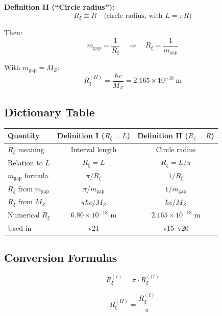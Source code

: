 \documentclass[11pt,a4paper]{article}
\newcommand{\Rxi}{R_\xi}
\newcommand{\MZ}{M_Z}
\newcommand{\mgap}{m_{\mathrm{gap}}}
\begin{document}
\textbf{Definition II (``Circle radius''):}
\begin{equation}
\Rxi \equiv R \quad \text{(circle radius, with } L = \pi R\text{)}
\label{eq:Rxi-def-II}
\end{equation}

Then:
\begin{equation}
\mgap = \frac{1}{\Rxi} \quad \Rightarrow \quad \Rxi = \frac{1}{\mgap}
\label{eq:def-II-relations}
\end{equation}

With $\mgap = \MZ$:
\begin{equation}
\Rxi^{(II)} = \frac{\hbar c}{\MZ} = 2.165 \times 10^{-18}~\mathrm{m}
\label{eq:Rxi-II-numerical}
\end{equation}

\subsection{Dictionary Table}

\begin{center}
\begin{tabular}{lcc}
\toprule
\textbf{Quantity} & \textbf{Definition I} ($\Rxi = L$) & \textbf{Definition II} ($\Rxi = R$) \\
\midrule
$\Rxi$ meaning & Interval length & Circle radius \\
Relation to $L$ & $\Rxi = L$ & $\Rxi = L/\pi$ \\
$\mgap$ formula & $\pi/\Rxi$ & $1/\Rxi$ \\
$\Rxi$ from $\mgap$ & $\pi/\mgap$ & $1/\mgap$ \\
$\Rxi$ from $\MZ$ & $\pi\hbar c/\MZ$ & $\hbar c/\MZ$ \\
Numerical $\Rxi$ & $6.80 \times 10^{-18}$ m & $2.165 \times 10^{-18}$ m \\
Used in & v21 & v15--v20 \\
\bottomrule
\end{tabular}
\end{center}

\subsection{Conversion Formulas}

\begin{equation}
\Rxi^{(I)} = \pi \cdot \Rxi^{(II)}
\label{eq:Rxi-conversion}
\end{equation}

\begin{equation}
\Rxi^{(II)} = \frac{\Rxi^{(I)}}{\pi}
\label{eq:Rxi-conversion-inv}
\end{equation}
\end{document}

